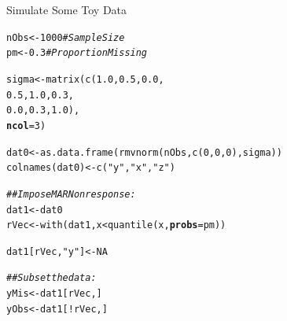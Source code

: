 \documentclass{beamer}\usepackage[]{graphicx}\usepackage[]{color}
\makeatletter
\newcommand{\hlnum}[1]{\textcolor[rgb]{0.69,0.494,0}{#1}}%
\newcommand{\hlstr}[1]{\textcolor[rgb]{0.749,0.012,0.012}{#1}}%
\newcommand{\hlcom}[1]{\textcolor[rgb]{0.514,0.506,0.514}{\textit{#1}}}%
\newcommand{\hlopt}[1]{\textcolor[rgb]{0,0,0}{#1}}%
\newcommand{\hlstd}[1]{\textcolor[rgb]{0,0,0}{#1}}%
\newcommand{\hlkwb}[1]{\textcolor[rgb]{0,0.341,0.682}{#1}}%
\newcommand{\hlkwc}[1]{\textcolor[rgb]{0,0,0}{\textbf{#1}}}%
\newcommand{\hlkwd}[1]{\textcolor[rgb]{0.004,0.004,0.506}{#1}}%
\newenvironment{kframe}{%
 \def\at@end@of@kframe{}%
 \ifinner\ifhmode%
  \def\at@end@of@kframe{\end{minipage}}%
  \begin{minipage}{\columnwidth}%
 \fi\fi%
 \def\FrameCommand##1{\hskip\@totalleftmargin \hskip-\fboxsep
 \colorbox{shadecolor}{##1}\hskip-\fboxsep
     \hskip-\linewidth \hskip-\@totalleftmargin \hskip\columnwidth}%
 \MakeFramed {\advance\hsize-\width
   \@totalleftmargin\z@ \linewidth\hsize
   \@setminipage}}%
 {\par\unskip\endMakeFramed%
 \at@end@of@kframe}
\newenvironment{knitrout}{}{} %
\makeatother
\begin{document}
\begin{frame}{Simulate Some Toy Data}
  
\begin{knitrout}\footnotesize
{}\color{fgcolor}\begin{kframe}
\begin{alltt}
\hlstd{nObs} \hlkwb{<-} \hlnum{1000} \hlcom{# Sample Size}
\hlstd{pm}   \hlkwb{<-} \hlnum{0.3}  \hlcom{# Proportion Missing}

\hlstd{sigma} \hlkwb{<-} \hlkwd{matrix}\hlstd{(}\hlkwd{c}\hlstd{(}\hlnum{1.0}\hlstd{,} \hlnum{0.5}\hlstd{,} \hlnum{0.0}\hlstd{,}
                  \hlnum{0.5}\hlstd{,} \hlnum{1.0}\hlstd{,} \hlnum{0.3}\hlstd{,}
                  \hlnum{0.0}\hlstd{,} \hlnum{0.3}\hlstd{,} \hlnum{1.0}\hlstd{),}
                \hlkwc{ncol} \hlstd{=} \hlnum{3}\hlstd{)}

\hlstd{dat0} \hlkwb{<-} \hlkwd{as.data.frame}\hlstd{(}\hlkwd{rmvnorm}\hlstd{(nObs,} \hlkwd{c}\hlstd{(}\hlnum{0}\hlstd{,} \hlnum{0}\hlstd{,} \hlnum{0}\hlstd{), sigma))}
\hlkwd{colnames}\hlstd{(dat0)} \hlkwb{<-} \hlkwd{c}\hlstd{(}\hlstr{"y"}\hlstd{,} \hlstr{"x"}\hlstd{,} \hlstr{"z"}\hlstd{)}
\end{alltt}
\end{kframe}
\end{knitrout}

\pagebreak

\begin{knitrout}\footnotesize
{}\color{fgcolor}\begin{kframe}
\begin{alltt}
\hlcom{## Impose MAR Nonresponse:}
\hlstd{dat1} \hlkwb{<-} \hlstd{dat0}
\hlstd{rVec} \hlkwb{<-} \hlkwd{with}\hlstd{(dat1, x} \hlopt{<} \hlkwd{quantile}\hlstd{(x,} \hlkwc{probs} \hlstd{= pm))}

\hlstd{dat1[rVec,} \hlstr{"y"}\hlstd{]} \hlkwb{<-} \hlnum{NA}

\hlcom{## Subset the data:}
\hlstd{yMis} \hlkwb{<-} \hlstd{dat1[rVec, ]}
\hlstd{yObs} \hlkwb{<-} \hlstd{dat1[}\hlopt{!}\hlstd{rVec, ]}
\end{alltt}
\end{kframe}
\end{knitrout}

\end{frame}

\end{document}
